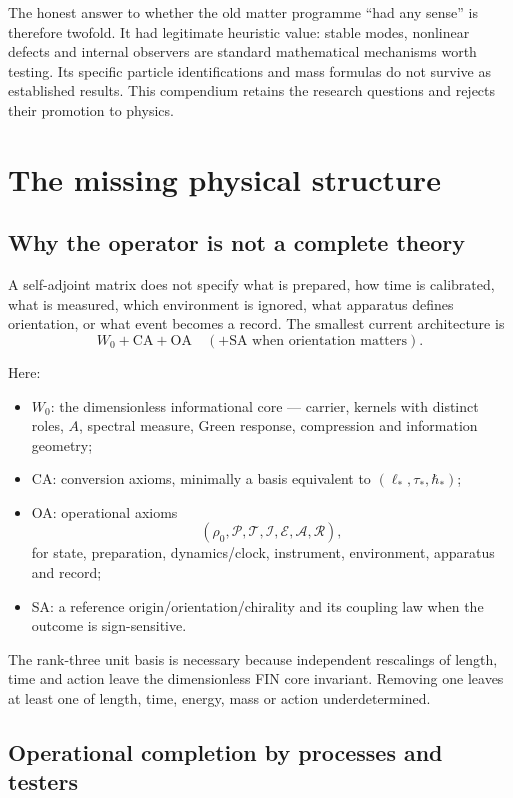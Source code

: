 \documentclass[11pt,a4paper]{article}
\theoremstyle{definition}
\theoremstyle{remark}
\begin{document}
The honest answer to whether the old matter programme ``had any sense'' is therefore twofold. It had legitimate heuristic value: stable modes, nonlinear defects and internal observers are standard mathematical mechanisms worth testing. Its specific particle identifications and mass formulas do not survive as established results. This compendium retains the research questions and rejects their promotion to physics.

\section{The missing physical structure}

\subsection{Why the operator is not a complete theory}

A self-adjoint matrix does not specify what is prepared, how time is calibrated, what is measured, which environment is ignored, what apparatus defines orientation, or what event becomes a record. The smallest current architecture is
\[
\boxed{W_0+\mathrm{CA}+\mathrm{OA}\quad(+\mathrm{SA}\text{ when orientation matters})}.
\]

Here:

\begin{itemize}
\item $W_0$: the dimensionless informational core --- carrier, kernels with distinct roles, $A$, spectral measure, Green response, compression and information geometry;
\item CA: conversion axioms, minimally a basis equivalent to $(\ell_*,\tau_*,\hbar_*)$;
\item OA: operational axioms
\[
(\rho_0,\mathcal P,\mathcal T,\mathcal I,\mathcal E,\mathcal A,\mathcal R),
\]
for state, preparation, dynamics/clock, instrument, environment, apparatus and record;
\item SA: a reference origin/orientation/chirality and its coupling law when the outcome is sign-sensitive.
\end{itemize}

The rank-three unit basis is necessary because independent rescalings of length, time and action leave the dimensionless FIN core invariant. Removing one leaves at least one of length, time, energy, mass or action underdetermined.

\subsection{Operational completion by processes and testers}
\end{document}
